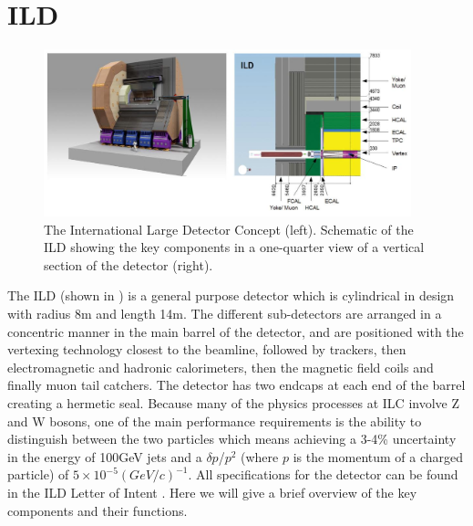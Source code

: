 \section{ILD}
\begin{figure}
  \centering
  \includegraphics[width=0.95\textwidth,keepaspectratio]{fig/ILD}
  \caption[ILD Detector]{The International Large Detector Concept (left). Schematic of the ILD showing the key components in a one-quarter view of a vertical section of the detector (right). \cite{ILCTDR}}
  \label{Fig:ILD}
\end{figure}
The ILD (shown in ) is a general purpose detector which is cylindrical in design with radius 8m and length 14m. The different sub-detectors are arranged in a concentric manner in the main barrel of the detector, and are positioned with the vertexing technology closest to the beamline, followed by trackers, then electromagnetic and hadronic calorimeters, then the magnetic field coils and finally muon tail catchers. The detector has two endcaps at each end of the barrel creating a hermetic seal. Because many of the physics processes at \ac{ILC} involve Z and W bosons, one of the main performance requirements is the ability to distinguish between the two particles which means achieving a 3-4\% uncertainty in the energy of 100GeV jets and a ${\delta p}$/${p^2}$ (where $p$ is the momentum of a charged particle) of ${5\times10^{-5} (GeV/c)^{-1}}$. All specifications for the detector can be found in the \ac{ILD} Letter of Intent \cite{ILD}. Here we will give a brief overview of the key components and their functions.

